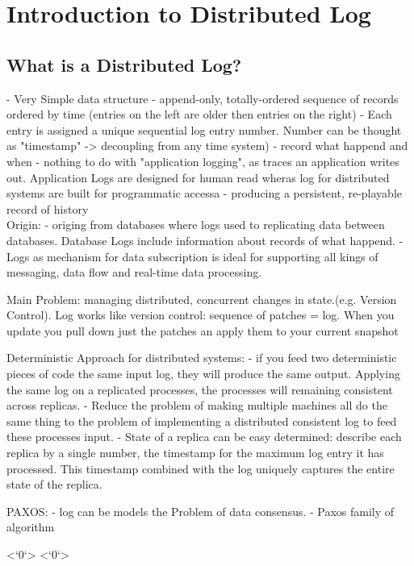 \chapter{Introduction to Distributed Log}
\section{What is a Distributed Log?}
- Very Simple data structure 
- append-only, totally-ordered sequence of records ordered by time (entries on
the left are older then entries on the right)
- Each entry is assigned a unique sequential log entry number. Number can be
thought as "timestamp" -> decoupling from any time system) 
- record what happend and when 
- nothing to do with "application logging", as traces an application writes
out. Application Logs are designed for human read wheras log for distributed
systems are built for programmatic accessa
- producing a persistent, re-playable record of history
\\
Origin:
- origing from databases where logs used to replicating data between databases.
Database Logs include information about records of what happend. 
- Logs as mechanism for data subscription is ideal for supporting all kings of
messaging, data flow and real-time data processing. 

Main Problem: managing distributed, concurrent changes in state.(e.g. Version
Control). Log works like version control: sequence of patches = log. When you
update you pull down just the patches an apply them to your current snapshot 

Deterministic Approach for distributed systems: 
- if you feed two deterministic pieces of code the same
input log, they will produce the same output. Applying the same log on a
replicated processes, the processes will remaining consistent across replicas. 
- Reduce the problem of making multiple machines all do the same thing to the
problem of implementing a distributed consistent log to feed these processes
input.
- State of a replica can be easy determined: describe each replica by a single
number, the timestamp for the maximum log entry it has processed. This timestamp
combined with the log uniquely captures the entire state of the replica. 

PAXOS: 
- log can be models the Problem of data consensus.  
- Paxos family of algorithm 

<`0`>
<`0`>
